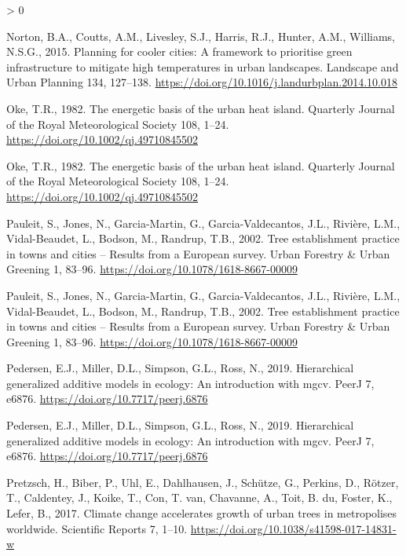 \documentclass[
]{article}
\newlength{\cslhangindent}
\newenvironment{CSLReferences}[2] %
 {%
  \setlength{\parindent}{0pt}
  \ifodd #1 \everypar{\setlength{\hangindent}{\cslhangindent}}\ignorespaces\fi
  \ifnum #2 > 0
  \setlength{\parskip}{#2\baselineskip}
  \fi
 }%
 {}
\begin{document}
\begin{CSLReferences}{1}{0}
\leavevmode\hypertarget{ref-norton2015}{}%
Norton, B.A., Coutts, A.M., Livesley, S.J., Harris, R.J., Hunter, A.M., Williams, N.S.G., 2015. Planning for cooler cities: {A} framework to prioritise green infrastructure to mitigate high temperatures in urban landscapes. Landscape and Urban Planning 134, 127--138. \url{https://doi.org/10.1016/j.landurbplan.2014.10.018}

\leavevmode\hypertarget{ref-oke1982}{}%
Oke, T.R., 1982. The energetic basis of the urban heat island. Quarterly Journal of the Royal Meteorological Society 108, 1--24. \url{https://doi.org/10.1002/qj.49710845502}

\leavevmode\hypertarget{ref-oke1982}{}%
Oke, T.R., 1982. The energetic basis of the urban heat island. Quarterly Journal of the Royal Meteorological Society 108, 1--24. \url{https://doi.org/10.1002/qj.49710845502}

\leavevmode\hypertarget{ref-pauleit2002}{}%
Pauleit, S., Jones, N., Garcia-Martin, G., Garcia-Valdecantos, J.L., Rivière, L.M., Vidal-Beaudet, L., Bodson, M., Randrup, T.B., 2002. Tree establishment practice in towns and cities -- {Results} from a {European} survey. Urban Forestry \& Urban Greening 1, 83--96. \url{https://doi.org/10.1078/1618-8667-00009}

\leavevmode\hypertarget{ref-pauleit2002}{}%
Pauleit, S., Jones, N., Garcia-Martin, G., Garcia-Valdecantos, J.L., Rivière, L.M., Vidal-Beaudet, L., Bodson, M., Randrup, T.B., 2002. Tree establishment practice in towns and cities -- {Results} from a {European} survey. Urban Forestry \& Urban Greening 1, 83--96. \url{https://doi.org/10.1078/1618-8667-00009}

\leavevmode\hypertarget{ref-pedersen2019}{}%
Pedersen, E.J., Miller, D.L., Simpson, G.L., Ross, N., 2019. Hierarchical generalized additive models in ecology: An introduction with mgcv. PeerJ 7, e6876. \url{https://doi.org/10.7717/peerj.6876}

\leavevmode\hypertarget{ref-pedersen2019}{}%
Pedersen, E.J., Miller, D.L., Simpson, G.L., Ross, N., 2019. Hierarchical generalized additive models in ecology: An introduction with mgcv. PeerJ 7, e6876. \url{https://doi.org/10.7717/peerj.6876}

\leavevmode\hypertarget{ref-pretzsch2017}{}%
Pretzsch, H., Biber, P., Uhl, E., Dahlhausen, J., Schütze, G., Perkins, D., Rötzer, T., Caldentey, J., Koike, T., Con, T. van, Chavanne, A., Toit, B. du, Foster, K., Lefer, B., 2017. Climate change accelerates growth of urban trees in metropolises worldwide. Scientific Reports 7, 1--10. \url{https://doi.org/10.1038/s41598-017-14831-w}


\end{CSLReferences}
\end{document}

